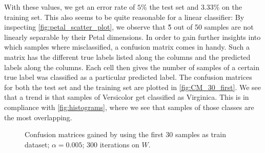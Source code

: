 \documentclass{article}
\begin{document}
With these values, we get an error rate of $5\%$ the test set and $3.33\%$ on the training set. This
also seems to be quite reasonable for a linear classifier: By inspecting \autoref{fig:petal_scatter_plot},
we observe that \~5 out of 50 samples are not linearly separable by their Petal dimensions.
In order to gain further insights into which samples where misclassified, a confusion matrix comes in
handy. Such a matrix has the different true labels listed along the columns and the predicted labels
along the columns. Each cell then gives the number of samples of a certain true label was classified
as a particular predicted label. The confusion matrices for both the test set and the training set are
plotted in \autoref{fig:CM_30_first}. We see that a trend is that samples of Versicolor get classified
as Virginica. This is in compliance with \autoref{fig:histograms}, where we see that samples of
those classes are the most overlapping.

\begin{figure}
    \centering
    \qquad
    \caption{Confusion matrices gained by using the first 30 samples as train dataset;%
    $\alpha = 0.005$; 300 iterations on $W$.}\label{fig:CM_30_first}
\end{figure}
\end{document}
